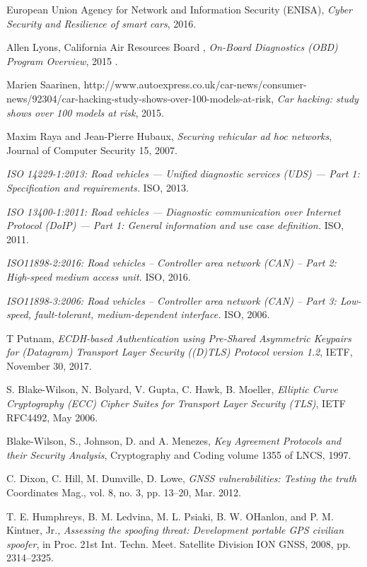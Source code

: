 \documentclass[11pt]{article}
\begin{document}
\begin{thebibliography}{10}
	European Union Agency for Network and Information Security (ENISA),
	\textit{Cyber Security and Resilience of smart cars},
	2016.
	
	Allen Lyons, California Air Resources Board ,
	\textit{On-Board Diagnostics (OBD) Program Overview},
	2015 .
	
	Marien Saarinen, http://www.autoexpress.co.uk/car-news/consumer-news/92304/car-hacking-study-shows-over-100-models-at-risk, 
	\textit{Car hacking: study shows over 100 models at risk},
	2015.
	
	Maxim Raya and Jean-Pierre Hubaux, \textit{Securing vehicular ad hoc networks}, Journal of Computer Security 15, 2007.

	\textit{ISO 14229-1:2013: Road vehicles — Unified diagnostic services (UDS) — Part 1: Specification and requirements.}
	ISO, 2013.
	
	\textit{ISO 13400-1:2011: Road vehicles — Diagnostic communication over Internet Protocol (DoIP) — Part 1: General information and use case definition.} ISO, 2011.
	
	\textit{ISO11898-2:2016: Road vehicles -- Controller area network (CAN) -- Part 2: High-speed medium access unit.} ISO, 2016.
	
	\textit{ISO11898-3:2006: Road vehicles -- Controller area network (CAN) -- Part 3: Low-speed, fault-tolerant, medium-dependent interface.} ISO, 2006.
	
	T Putnam, \textit{ECDH-based Authentication using Pre-Shared Asymmetric Keypairs for (Datagram) Transport Layer Security ((D)TLS) Protocol version 1.2}, IETF, November 30, 2017.
	
	S. Blake-Wilson, N. Bolyard, V. Gupta, C. Hawk, B. Moeller, \textit{Elliptic Curve Cryptography (ECC) Cipher Suites for Transport Layer Security (TLS)}, IETF RFC4492, May 2006.
	
	
	Blake-Wilson, S., Johnson, D. and A. Menezes, \textit{Key Agreement Protocols and their Security Analysis}, Cryptography and Coding volume 1355 of LNCS, 1997.
	
	C. Dixon, C. Hill, M. Dumville, D. Lowe, \textit{GNSS vulnerabilities: Testing the truth} Coordinates Mag., vol. 8, no. 3, pp. 13–20,
	Mar. 2012.
	
	T. E. Humphreys, B. M. Ledvina, M. L. Psiaki, B. W. OHanlon, and
	P. M. Kintner, Jr., \textit{Assessing the spoofing threat: Development portable GPS civilian spoofer}, in Proc. 21st Int. Techn. Meet. Satellite Division ION GNSS, 2008, pp. 2314–2325.
	

\end{thebibliography}
\end{document}

